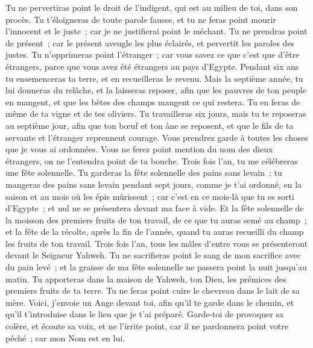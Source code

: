 \begin{multicols}{2}
Tu ne pervertiras point le droit de l'indigent, qui est au milieu de toi, dans son procès.
Tu t'éloigneras de toute parole fausse, et tu ne feras point mourir l'innocent et le juste~; car je ne justifierai point le méchant.
Tu ne prendras point de présent~; car le présent aveugle les plus éclairés, et pervertit les paroles des justes.
Tu n'opprimeras point l'étranger~; car vous savez ce que c'est que d'être étrangers, parce que vous avez été étrangers au pays d'Egypte.
Pendant six ans tu ensemenceras ta terre, et en recueilleras le revenu.
Mais la septième année, tu lui donneras du relâche, et la laisseras reposer, afin que les pauvres de ton peuple en mangent, et que les bêtes des champs mangent ce qui restera. Tu en feras de même de ta vigne et de tes oliviers.
Tu travailleras six jours, mais tu te reposeras au septième jour, afin que ton bœuf et ton âne se reposent, et que le fils de ta servante et l'étranger reprennent courage.
Vous prendrez garde à toutes les choses que je vous ai ordonnées. Vous ne ferez point mention du nom des dieux étrangers, on ne l'entendra point de ta bouche.
Trois fois l'an, tu me célébreras une fête solennelle.
Tu garderas la fête solennelle des pains sans levain~; tu mangeras des pains sans levain pendant sept jours, comme je t'ai ordonné, en la saison et au mois où les épis mûrissent~; car c'est en ce mois-là que tu es sorti d'Egypte~; et nul ne se présentera devant ma face à vide.
Et la fête solennelle de la moisson des premiers fruits de ton travail, de ce que tu auras semé au champ~; et la fête de la récolte, après la fin de l'année, quand tu auras recueilli du champ les fruits de ton travail.
Trois fois l'an, tous les mâles d'entre vous se présenteront devant le Seigneur Yahweh.
Tu ne sacrifieras point le sang de mon sacrifice avec du pain levé~; et la graisse de ma fête solennelle ne passera point la nuit jusqu'au matin.
Tu apporteras dans la maison de Yahweh, ton Dieu, les prémices des premiers fruits de ta terre. Tu ne feras point cuire le chevreau dans le lait de sa mère.
Voici, j'envoie un Ange devant toi, afin qu'il te garde dans le chemin, et qu'il t'introduise dans le lieu que je t'ai préparé.
Garde-toi de provoquer sa colère, et écoute sa voix, et ne l'irrite point, car il ne pardonnera point votre péché~; car mon Nom est en lui.

\end{multicols}
